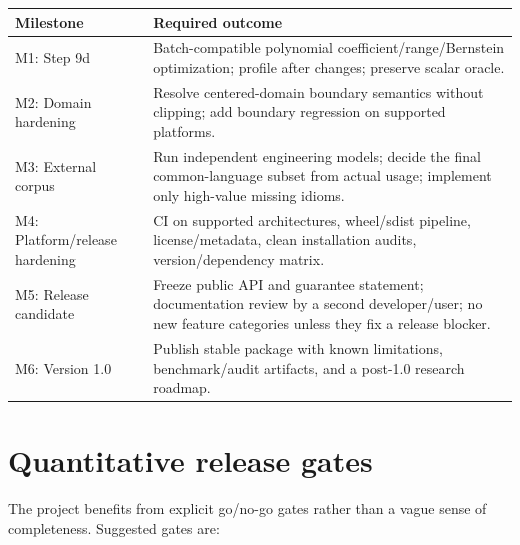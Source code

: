\documentclass[11pt]{article}
\begin{document}
\begin{longtable}{p{}p{}}
\toprule
Milestone & Required outcome \\
\midrule
\endhead
M1: Step 9d & Batch-compatible polynomial coefficient/range/Bernstein optimization; profile after changes; preserve scalar oracle. \\
M2: Domain hardening & Resolve centered-domain boundary semantics without clipping; add boundary regression on supported platforms. \\
M3: External corpus & Run independent engineering models; decide the final common-language subset from actual usage; implement only high-value missing idioms. \\
M4: Platform/release hardening & CI on supported architectures, wheel/sdist pipeline, license/metadata, clean installation audits, version/dependency matrix. \\
M5: Release candidate & Freeze public API and guarantee statement; documentation review by a second developer/user; no new feature categories unless they fix a release blocker. \\
M6: Version 1.0 & Publish stable package with known limitations, benchmark/audit artifacts, and a post-1.0 research roadmap. \\
\bottomrule
\end{longtable}

\section{Quantitative release gates}

The project benefits from explicit go/no-go gates rather than a vague sense of
completeness.  Suggested gates are:
\end{document}
